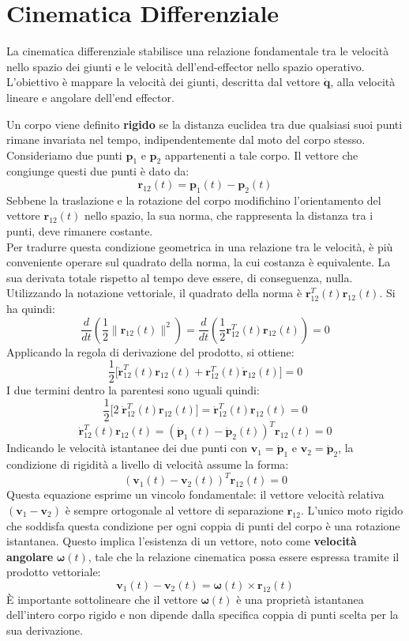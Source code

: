 ﻿\documentclass[11pt, a4paper]{article}
\author{Francesco Lo Verde}
\begin{document}
\section{Cinematica Differenziale}
La cinematica differenziale stabilisce una relazione fondamentale tra le velocità nello spazio dei giunti e le velocità dell'end-effector nello spazio operativo. L'obiettivo è mappare la velocità dei giunti, descritta dal vettore \(\dot{\bm{q}}\), alla velocità lineare e angolare dell'end effector.

Un corpo viene definito \textbf{rigido} se la distanza euclidea tra due qualsiasi suoi punti rimane invariata nel tempo, indipendentemente dal moto del corpo stesso. Consideriamo due punti \(\bm{p}_1\) e \(\bm{p}_2\) appartenenti a tale corpo. Il vettore che congiunge questi due punti è dato da:
\[
    \bm{r}_{12}(t) = \bm{p}_1(t) - \bm{p}_2(t)
\]
Sebbene la traslazione e la rotazione del corpo modifichino l'orientamento del vettore \(\bm{r}_{12}(t)\) nello spazio, la sua norma, che rappresenta la distanza tra i punti, deve rimanere costante.\\
Per tradurre questa condizione geometrica in una relazione tra le velocità, è più conveniente operare sul quadrato della norma, la cui costanza è equivalente. La sua derivata totale rispetto al tempo deve essere, di conseguenza, nulla. Utilizzando la notazione vettoriale, il quadrato della norma è \(\bm{r}_{12}^T(t) \bm{r}_{12}(t)\). Si ha quindi:
\[
    \frac{d}{dt} \left( \frac{1}{2} \| \bm{r}_{12}(t) \|^2 \right) = \frac{d}{dt} \left( \frac{1}{2} \bm{r}_{12}^T(t) \bm{r}_{12}(t) \right) = 0
\]
Applicando la regola di derivazione del prodotto, si ottiene:
\[
    \frac{1}{2} \biggl[ \dot{\bm{r}}_{12}^T(t) \bm{r}_{12}(t) + \bm{r}_{12}^T(t) \dot{\bm{r}}_{12}(t) \biggr] = 0
\]
I due termini dentro la parentesi sono uguali quindi:
\[
    \frac{1}{2} \biggl[ 2 \; \dot{\bm{r}}_{12}^T(t) \bm{r}_{12}(t) \biggr] = \dot{\bm{r}}_{12}^T(t) \bm{r}_{12}(t) = 0
\]
\[
    \dot{\bm{r}}_{12}^T(t) \bm{r}_{12}(t) = \left( \dot{\bm{p}}_1(t) - \dot{\bm{p}}_2(t) \right)^T \bm{r}_{12}(t) = 0
\]
Indicando le velocità istantanee dei due punti con \(\bm{v}_1 = \dot{\bm{p}}_1\) e \(\bm{v}_2 = \dot{\bm{p}}_2\), la condizione di rigidità a livello di velocità assume la forma:
\[
    \left( \bm{v}_1(t) - \bm{v}_2(t) \right)^T \bm{r}_{12}(t) = 0
\]
Questa equazione esprime un vincolo fondamentale: il vettore velocità relativa \((\bm{v}_1 - \bm{v}_2)\) è sempre ortogonale al vettore di separazione \(\bm{r}_{12}\). L'unico moto rigido che soddisfa questa condizione per ogni coppia di punti del corpo è una rotazione istantanea. Questo implica l'esistenza di un vettore, noto come \textbf{velocità angolare} \(\bm{\omega}(t)\), tale che la relazione cinematica possa essere espressa tramite il prodotto vettoriale:
\[
    \bm{v}_1(t) - \bm{v}_2(t) = \bm{\omega}(t) \times \bm{r}_{12}(t)
\]
È importante sottolineare che il vettore \(\bm{\omega}(t)\) è una proprietà istantanea dell'intero corpo rigido e non dipende dalla specifica coppia di punti scelta per la sua derivazione.
\end{document}
